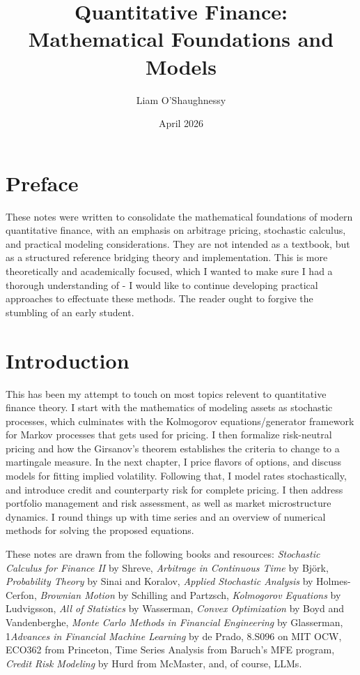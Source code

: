 \documentclass{report}
\title{Quantitative Finance: Mathematical Foundations and Models}
\author{Liam O'Shaughnessy}
\date{April 2026}
\theoremstyle{spacedplain}
\theoremstyle{spaceddefinition}
\theoremstyle{spacedremark}
\begin{document}
\maketitle

\chapter*{Preface}
These notes were written to consolidate the mathematical foundations of modern quantitative finance, with an emphasis on arbitrage pricing, stochastic calculus, and practical modeling considerations. They are not intended as a textbook, but as a structured reference bridging theory and implementation. This is more theoretically and academically focused, which I wanted to make sure I had a thorough understanding of - I would like to continue developing practical approaches to effectuate these methods. The reader ought to forgive the stumbling of an early student.

\tableofcontents


\chapter{Introduction}
This has been my attempt to touch on most topics relevent to quantitative finance theory. I start with the mathematics of modeling assets as stochastic processes, which culminates with the Kolmogorov equations/generator framework for Markov processes that gets used for pricing. I then formalize risk-neutral pricing and how the Girsanov's theorem establishes the criteria to change to a martingale measure. In the next chapter, I price flavors of options, and discuss models for fitting implied volatility. Following that, I model rates stochastically, and introduce credit and counterparty risk for complete pricing. I then address portfolio management and risk assessment, as well as market microstructure dynamics. I round things up with time series and an overview of numerical methods for solving the proposed equations.

These notes are drawn from the following books and resources: \textit{Stochastic Calculus for Finance II} by Shreve, \textit{Arbitrage in Continuous Time} by Björk, \textit{Probability Theory} by Sinai and Koralov, \textit{Applied Stochastic Analysis} by Holmes-Cerfon, \textit{Brownian Motion} by Schilling and Partzsch, \textit{Kolmogorov Equations} by Ludvigsson, \textit{All of Statistics} by Wasserman, \textit{Convex Optimization} by Boyd and Vandenberghe, \textit{Monte Carlo Methods in Financial Engineering} by Glasserman, 1\textit{Advances in Financial Machine Learning} by de Prado, 8.S096 on MIT OCW, ECO362 from Princeton, Time Series Analysis from Baruch's MFE program, \textit{Credit Risk Modeling} by Hurd from McMaster, and, of course, LLMs.
\end{document}
